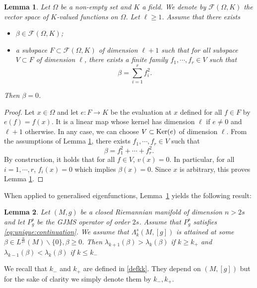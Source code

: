 \documentclass[10pt]{amsart}
\numberwithin{equation}{section}
\def\Om{{\Omega}}
\def\ker{{\mathop{\rm Ker}}}
\theoremstyle{plain}
\newtheorem{lemme}{Lemma}[section]%
\theoremstyle{remark}
\begin{document}
\begin{lemme} \label{tech_lem} Let $\Omega$ be a non-empty set and $K$ a field. We denote by $\mathcal{F}(\Omega,K)$ the vector space of $K$-valued  functions on $\Om$. Let  $\ell \geq 1$. Assume that there exists 
\begin{itemize}
    \item  $\beta \in  \mathcal{F}(\Omega,K)$; 
    \item a subspace $F \subset  \mathcal{F}(\Omega,K)$ of dimension $\ell+1$ such that for all subspace $V \subset F$ of dimension $\ell$, there exists a finite family $f_1,\cdots,f_r \in V$ such that 
    $$\beta=\sum_{i=1}^{r} f_i^2.$$ 
\end{itemize}
Then $\beta=0$. 
\end{lemme} 
\begin{proof}
Let $x \in \Om$ and let $e:F \to K$ be the evaluation at $x$ defined for all $f \in F$ by $e(f)=f(x)$. 
It is a linear map whose kernel has dimension  $\ell$ if $e\not=0$ and $\ell+1$ otherwise. In any case, we can choose $V \subset \ker(e)$ of dimension $\ell$.
From the assumptions of Lemma \ref{tech_lem}, there exists $f_1,\cdots,f_r \in V$ such that 
$$\beta=f_1^2 + \cdots +f_r^2.$$ 
By construction, it holds that for  all $f \in V$, $v(x)=0$. In particular, for all $i=1,\cdots,r$, $f_i(x)=0$ which implies 
$\beta(x)=0$. Since $x$ is arbitrary, this proves Lemma \ref{tech_lem}.
\end{proof}

When applied to generalised eigenfunctions, Lemma~\ref{tech_lem} yields the following result:

\begin{lemme} \label{corstrictk+1k} Let $(M,g)$ be a closed Riemannian manifold of dimension $n >2s$ and let $P_g^s$ be the GJMS operator of order $2s$. Assume that $P_g^s$ satisfies \eqref{eq:unique:continuation}. We assume that $\Lambda_k^s(M,[g])$ is attained at some $\beta \in L^{\frac{n}{2s}}(M) \backslash \{0\}, \beta \ge 0$. Then $\lambda_{k+1}(\beta) > \lambda_k(\beta)$ if $k \geq k_+$ and $\lambda_{k-1}(\beta) < \lambda_k(\beta)$ if $k \leq k_-$
\end{lemme}

We recall that $k_-$ and $k_+$ are defined in \eqref{defkk}. They depend on $(M,[g])$ but for the sake of clarity we simply denote them by $k_-, k_+$. 
\end{document}

